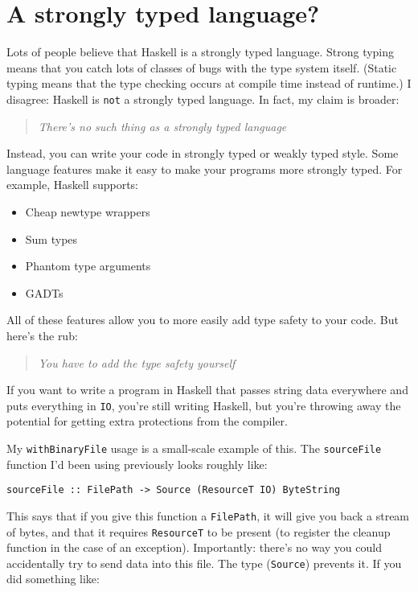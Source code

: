 \section{A strongly typed language?}

Lots of people believe that Haskell is a strongly typed language. Strong typing means that you catch lots of classes of bugs with the type system itself. (Static typing means that the type checking occurs at compile time instead of runtime.) I disagree: Haskell is \texttt{not} a strongly typed language. In fact, my claim is broader:

\begin{quotation}
\textit{There's no such thing as a strongly typed language}
\end{quotation}
Instead, you can write your code in strongly typed or weakly typed style. Some language features make it easy to make your programs more strongly typed. For example, Haskell supports:

\begin{itemize}
\item Cheap newtype wrappers
\item Sum types
\item Phantom type arguments
\item GADTs
\end{itemize}
All of these features allow you to more easily add type safety to your code. But here's the rub:

\begin{quotation}
 \textit{You have to add the type safety yourself }
\end{quotation}
If you want to write a program in Haskell that passes string data everywhere and puts everything in \texttt{IO}, you're still writing Haskell, but you're throwing away the potential for getting extra protections from the compiler.

My \texttt{withBinaryFile} usage is a small-scale example of this. The \texttt{sourceFile} function I'd been using previously looks roughly like:

\begin{verbatim}
sourceFile :: FilePath -> Source (ResourceT IO) ByteString
\end{verbatim}
This says that if you give this function a \texttt{FilePath}, it will give you back a stream of bytes, and that it requires \texttt{ResourceT} to be present (to register the cleanup function in the case of an exception). Importantly: there's no way you could accidentally try to send data into this file. The type (\texttt{Source}) prevents it. If you did something like:

